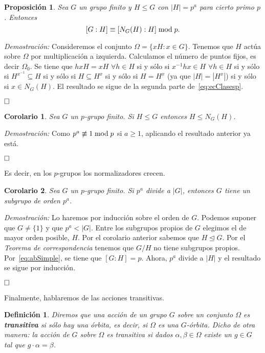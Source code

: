 \documentclass[12pt]{article}
\newtheorem{proposition}[theorem]{Proposición}
\newtheorem{definition}[theorem]{Definición}
\newtheorem{corolario}{Corolario}[theorem]
\begin{document}
\begin{proposition}Sea $G$ un grupo finito y $H \leq G$ con $|H| = p^a$ para cierto primo $p$. Entonces $$[G:H] \equiv [N_G(H):H] \hspace{0.1cm}\text{mod} \hspace{0.1cm} p.$$
\end{proposition}
\emph{Demostración: }Consideremos el conjunto $\Omega = \lbrace xH : x \in G \rbrace$. Tenemos que $H$ actúa sobre $\Omega$ por multiplicación a izquierda. Calculamos el número de puntos fijos, es decir $\Omega_0$. Se tiene que $hxH = xH$ $\forall h \in H$ si y sólo si $x^{-1}hx \in H$ $\forall h \in H$ si y sólo si $H^{x^{-1}} \subseteq H$ si y sólo si $H \subseteq H ^x$ si y sólo si $H = H^x$ (ya que $|H| = |H^x|$) si y sólo si $x\in N_G(H)$. El resultado se sigue de la segunda parte de~\ref{eq:ecClasesp}.

$\hfill \square$

\begin{corolario}\label{eq:cor411} Sea $G$ un $p$-grupo finito. Si $H \leq G$ entonces $H \leq N_G(H)$.
\end{corolario}
\emph{Demostración: }Como $p^a \not\equiv 1 \hspace{0.1cm}\text{mod} \hspace{0.1cm} p$ si $a \geq 1$, aplicando el resultado anterior ya está.

$\hfill \square$

Es decir, en los $p$-grupos los normalizadores crecen.

\begin{corolario}\label{eq:cor412} Sea $G$ un $p$-grupo finito. Si $p^a$ divide a $|G|$, entonces $G$ tiene un subgrupo de orden $p^a$.
\end{corolario}
\emph{Demostración: }Lo haremos por inducción sobre el orden de $G$. Podemos suponer que $G \neq \lbrace 1 \rbrace$ y que $p^a < |G|$. Entre los subgrupos propios de $G$ elegimos el de mayor orden posible, $H$. Por el corolario anterior sabemos que $H \unlhd G$. Por el \textit{Teorema de correspondencia} tenemos que $G/H$ no tiene subgrupos propios. Por~\ref{eq:abSimple}, se tiene que $[G:H] = p$. Ahora, $p^a$ divide a $|H|$ y el resultado se sigue por inducción.

$\hfill \square$

Finalmente, hablaremos de las acciones transitivas.

\begin{definition}Diremos que una acción de un grupo $G$ sobre un conjunto $\Omega$ es \textbf{transitiva} si sólo hay una órbita, es decir, si $\Omega$ es una $G$-órbita. Dicho de otra manera: la acción de $G$ sobre $\Omega$ es transitiva si dados $\alpha, \beta \in \Omega$ existe un $g \in G$ tal que $g \cdot \alpha = \beta$.
\end{definition}
\end{document}
